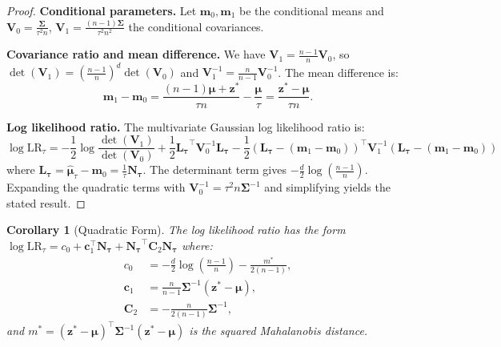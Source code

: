 \documentclass{article}
\theoremstyle{plain}
\newtheorem{corollary}[theorem]{Corollary}
\theoremstyle{definition}
\theoremstyle{remark}
\newcommand{\bs}{\boldsymbol}
\begin{document}
\begin{proof}
    \textbf{Conditional parameters.}
    Let $\mathbf{m}_0, \mathbf{m}_1$ be the conditional means and $\mathbf{V}_0 = \frac{\bs\Sigma}{\tau^2 n}$, $\mathbf{V}_1 = \frac{(n-1)\bs\Sigma}{\tau^2 n^2}$ the conditional covariances.

    \textbf{Covariance ratio and mean difference.}
    We have $\mathbf{V}_1 = \frac{n-1}{n}\mathbf{V}_0$, so $\det(\mathbf{V}_1) = \left(\frac{n-1}{n}\right)^d \det(\mathbf{V}_0)$ and $\mathbf{V}_1^{-1} = \frac{n}{n-1}\mathbf{V}_0^{-1}$. The mean difference is:
    \begin{equation*}
        \mathbf{m}_1 - \mathbf{m}_0 = \frac{(n-1)\bs\mu + \mathbf{z}^*}{\tau n} - \frac{\bs\mu}{\tau} = \frac{\mathbf{z}^* - \bs\mu}{\tau n}.
    \end{equation*}

    \textbf{Log likelihood ratio.}
    The multivariate Gaussian log likelihood ratio is:
    \begin{equation*}
        \log \mathrm{LR}_\tau = -\frac{1}{2}\log\frac{\det(\mathbf{V}_1)}{\det(\mathbf{V}_0)} + \frac{1}{2}\mathbf{L_\tau}^\top \mathbf{V}_0^{-1}\mathbf{L_\tau} - \frac{1}{2}(\mathbf{L_\tau} - (\mathbf{m}_1 - \mathbf{m}_0))^\top \mathbf{V}_1^{-1}(\mathbf{L_\tau} - (\mathbf{m}_1 - \mathbf{m}_0))
    \end{equation*}
    where $\mathbf{L_\tau} = \hat{\bs\mu}_\tau - \mathbf{m}_0 = \frac{1}{\tau}\mathbf{N_\tau}$.
    The determinant term gives $-\frac{d}{2}\log\left(\frac{n-1}{n}\right)$. Expanding the quadratic terms with $\mathbf{V}_0^{-1} = \tau^2 n \bs\Sigma^{-1}$ and simplifying yields the stated result.
\end{proof}

\begin{corollary}[Quadratic Form]
    \label{cor:multivariate-quadratic-form}
    The log likelihood ratio has the form $\log \mathrm{LR}_\tau = c_0 + \mathbf{c}_1^\top \mathbf{N_\tau} + \mathbf{N_\tau}^\top \mathbf{C}_2 \mathbf{N_\tau}$ where:
    \begin{align*}
        c_0          & = -\frac{d}{2}\log\left(\frac{n-1}{n}\right) - \frac{m^*}{2(n-1)}, \\
        \mathbf{c}_1 & = \frac{n}{n-1}\bs\Sigma^{-1}(\mathbf{z}^* - \bs\mu),         \\
        \mathbf{C}_2 & = -\frac{n}{2(n-1)}\bs\Sigma^{-1},
    \end{align*}
    and $m^* = (\mathbf{z}^* - \bs\mu)^\top \bs\Sigma^{-1}(\mathbf{z}^* - \bs\mu)$ is the squared Mahalanobis distance.
\end{corollary}
\end{document}
